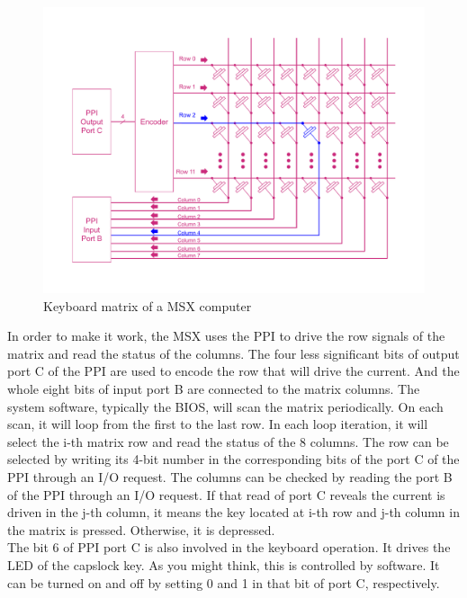 \begin{figure}
	\centering
	\includegraphics[width=1\linewidth,trim={0cm 5 0 0 40}]{images/figures/msx-arch-kbmatrix}
	\caption{Keyboard matrix of a MSX computer}
	\label{fig:msx-arch-kbmatrix}
\end{figure}

In order to make it work, the MSX uses the PPI to drive the row signals of the matrix and read the status of the columns.  The four less significant bits of output port C of the PPI are used to encode the row that will drive the current. And the whole eight bits of input port B are connected to the matrix columns. The system software, typically the BIOS, will scan the matrix periodically. On each scan, it will loop from the first to the last row. In each loop iteration, it will select the i-th matrix row and read the status of the 8 columns. The row can be selected by writing its 4-bit number in the corresponding bits of the port C of the PPI through an I/O request. The columns can be checked by reading the port B of the PPI through an I/O request. If that read of port C reveals the current is driven in the j-th column, it means the key located at i-th row and j-th column in the matrix is pressed. Otherwise, it is depressed. \\

The bit 6 of PPI port C is also involved in the keyboard operation. It drives the LED of the capslock key. As you might think, this is controlled by software. It can be turned on and off by setting 0 and 1 in that bit of port C, respectively. \\

